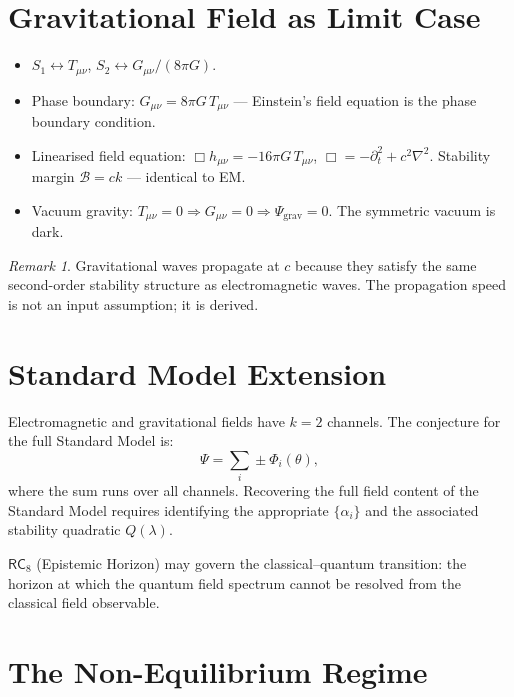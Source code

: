 \documentclass[11pt,twoside]{article}
\theoremstyle{plain}
\theoremstyle{definition}
\theoremstyle{remark}
\newtheorem{remark}[theorem]{Remark}
\newcommand{\RC}[1]{\textsf{RC}_{#1}}
\begin{document}
\section{Gravitational Field as Limit Case}

\begin{itemize}
\item $S_1 \leftrightarrow T_{\mu\nu}$, $S_2 \leftrightarrow G_{\mu\nu}/(8\pi G)$.
\item Phase boundary: $G_{\mu\nu}=8\pi G\,T_{\mu\nu}$ --- Einstein's field equation is
      the phase boundary condition.
\item Linearised field equation: $\Box h_{\mu\nu} = -16\pi G\,T_{\mu\nu}$,
      $\Box=-\partial_t^2+c^2\nabla^2$.
      Stability margin $\mathcal{B}=ck$ --- identical to EM.
\item Vacuum gravity: $T_{\mu\nu}=0\Rightarrow G_{\mu\nu}=0\Rightarrow\varPsi_{\mathrm{grav}}=0$.
      The symmetric vacuum is dark.
\end{itemize}

\begin{remark}
Gravitational waves propagate at $c$ because they satisfy the same second-order
stability structure as electromagnetic waves.  The propagation speed is not an
input assumption; it is derived.
\end{remark}

\section{Standard Model Extension}

Electromagnetic and gravitational fields have $k=2$ channels.  The
conjecture for the full Standard Model is:
\begin{equation}
  \varPsi = \sum_i \pm\Phi_i(\theta),
\end{equation}
where the sum runs over all channels.  Recovering the full field content of
the Standard Model requires identifying the appropriate $\{\alpha_i\}$ and
the associated stability quadratic $Q(\lambda)$.

$\RC{8}$ (Epistemic Horizon) may govern the classical--quantum transition:
the horizon at which the quantum field spectrum cannot be resolved from the
classical field observable.

\section{The Non-Equilibrium Regime}
\end{document}
